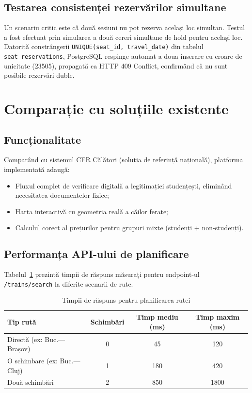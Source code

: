 \documentclass[12pt,a4paper]{report}
\begin{document}
\subsection{Testarea consistenței rezervărilor simultane}

Un scenariu critic este că două sesiuni nu pot rezerva același loc simultan. Testul a fost efectuat prin simularea a două cereri simultane de hold pentru același loc. Datorită constrângerii \texttt{UNIQUE(seat\_id, travel\_date)} din tabelul \texttt{seat\_reservations}, PostgreSQL respinge automat a doua inserare cu eroare de unicitate (23505), propagată ca HTTP 409 Conflict, confirmând că nu sunt posibile rezervări duble.

\section{Comparație cu soluțiile existente}

\subsection{Funcționalitate}

Comparând cu sistemul CFR Călători (soluția de referință națională), platforma implementată adaugă:
\begin{itemize}
  \item Fluxul complet de verificare digitală a legitimației studențești, eliminând necesitatea documentelor fizice;
  \item Harta interactivă cu geometria reală a căilor ferate;
  \item Calculul corect al prețurilor pentru grupuri mixte (studenți + non-studenți).
\end{itemize}

\subsection{Performanța API-ului de planificare}

Tabelul~\ref{tab:perf} prezintă timpii de răspuns măsurați pentru endpoint-ul \texttt{/trains/search} la diferite scenarii de rute.

\begin{table}[ht]\small\linespread{1}
\caption{Timpii de răspuns pentru planificarea rutei}
\label{tab:perf}
\begin{tabular}{l c c c}
\textbf{Tip rută} & \textbf{Schimbări} & \textbf{Timp mediu (ms)} & \textbf{Timp maxim (ms)} \\\hline
Directă (ex: Buc.—Brașov) & 0 & 45 & 120 \\
O schimbare (ex: Buc.—Cluj) & 1 & 180 & 420 \\
Două schimbări & 2 & 850 & 1800 \\
\hline
\end{tabular}
\end{table}
\end{document}
